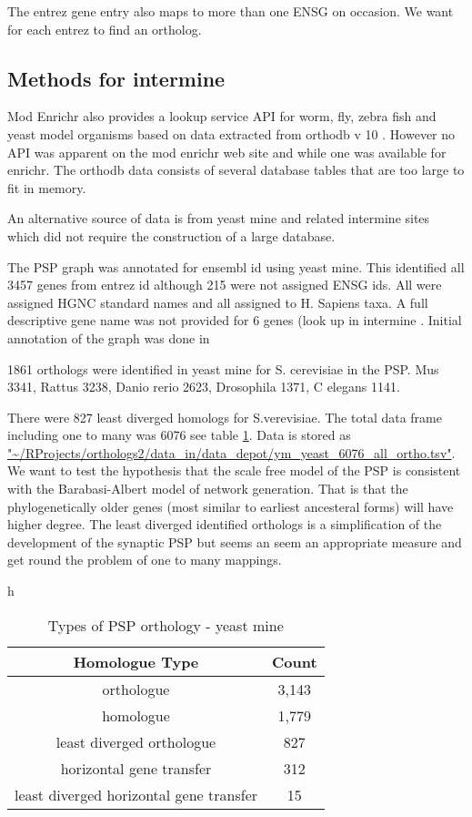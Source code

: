 The entrez gene entry also maps to more than one ENSG on occasion. We want for each entrez to find an ortholog. 

\subsection{Methods for intermine}
Mod Enrichr \cite{kuleshov2019modenrichr} also provides a lookup service API for worm, fly, zebra fish and yeast model organisms based on data extracted from orthodb v 10 \cite{kriventseva2019orthodb}  . However no API was apparent on the mod enrichr web site and while one was available for enrichr. The orthodb data consists of several database tables that are too large to fit in memory.

An alternative source of data is from yeast mine \cite{skrzypek2018saccharomyces} and related intermine sites which did not require the construction of a large database.

The PSP graph was annotated for ensembl id using yeast mine. This identified all 3457 genes from entrez id although 215 were not assigned ENSG ids. All were assigned HGNC standard names and all assigned to H. Sapiens taxa. A full descriptive gene name was not provided for 6 genes (look up in intermine . Initial annotation of the graph was done in 


1861 orthologs were identified in yeast mine for S. cerevisiae in the PSP. Mus  3341, Rattus 3238, Danio rerio 2623, Drosophila 1371, C elegans 1141.

There were 827 least diverged homologs for S.verevisiae. The total data frame including one to many was 6076 see table \ref{Table:Types of PSP orthology yeast mine}. Data is stored as \url{"~/RProjects/orthologs2/data_in/data_depot/ym_yeast_6076_all_ortho.tsv"}. We want to test the hypothesis that the scale free model of the PSP is consistent with the Barabasi-Albert model of network generation. That is that the phylogenetically older genes (most similar to earliest ancesteral forms) will have higher degree. The least diverged identified orthologs is a simplification of the development of the synaptic PSP but seems an  seem an appropriate measure and get round the problem of one to many mappings. 



\begin{table}{h}
\centering
\begin{tabular}{c|c}
   Homologue Type &	Count    \\
    \hline
    	orthologue 	&3,143 \\
    	homologue 	&1,779 \\
    	least diverged orthologue 	&827\\
    	horizontal gene transfer &	312\\
    	least diverged horizontal gene transfer 	&15\\
\end{tabular}
\caption{Types of PSP orthology - yeast mine}
\label{Table:Types of PSP orthology yeast mine}
\end{table}

